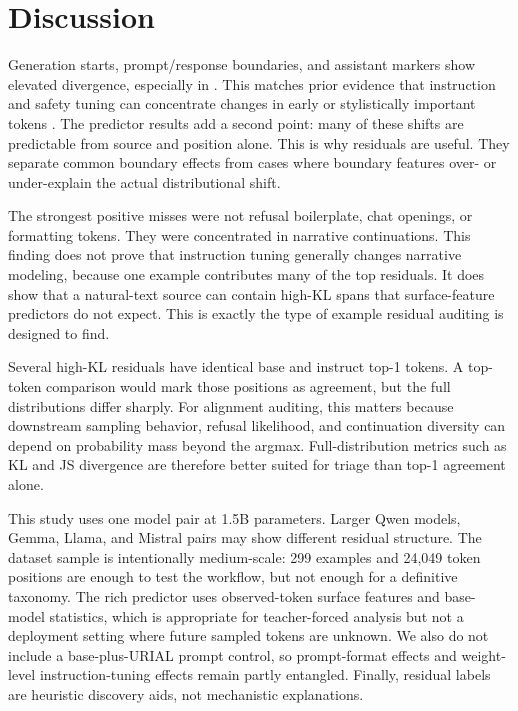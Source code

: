 \section{Discussion}
\label{sec:discussion}

Generation starts, prompt/response boundaries, and assistant markers show elevated divergence, especially in \beavertails. This matches prior evidence that instruction and safety tuning can concentrate changes in early or stylistically important tokens \citep{lin2023unlocking,ghosh2024limitations,qi2024safety}. The predictor results add a second point: many of these shifts are predictable from source and position alone. This is why residuals are useful. They separate common boundary effects from cases where boundary features over- or under-explain the actual distributional shift.

The strongest positive misses were not refusal boilerplate, chat openings, or formatting tokens. They were concentrated in \wikitext narrative continuations. This finding does not prove that instruction tuning generally changes narrative modeling, because one example contributes many of the top residuals. It does show that a natural-text source can contain high-KL spans that surface-feature predictors do not expect. This is exactly the type of example residual auditing is designed to find.

Several high-KL residuals have identical base and instruct top-1 tokens. A top-token comparison would mark those positions as agreement, but the full distributions differ sharply. For alignment auditing, this matters because downstream sampling behavior, refusal likelihood, and continuation diversity can depend on probability mass beyond the argmax. Full-distribution metrics such as KL and JS divergence are therefore better suited for triage than top-1 agreement alone.

This study uses one model pair at 1.5B parameters. Larger Qwen models, Gemma, Llama, and Mistral pairs may show different residual structure. The dataset sample is intentionally medium-scale: 299 examples and 24,049 token positions are enough to test the workflow, but not enough for a definitive taxonomy. The rich predictor uses observed-token surface features and base-model statistics, which is appropriate for teacher-forced analysis but not a deployment setting where future sampled tokens are unknown. We also do not include a base-plus-URIAL prompt control, so prompt-format effects and weight-level instruction-tuning effects remain partly entangled. Finally, residual labels are heuristic discovery aids, not mechanistic explanations.

